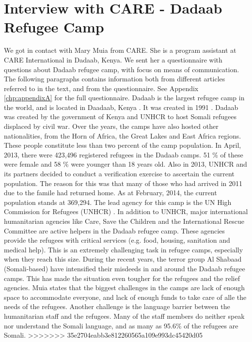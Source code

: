 \section{Interview with CARE - Dadaab Refugee Camp}
We got in contact with Mary Muia from CARE. She is a program assistant at CARE International in Dadaab, Kenya. We sent her a questionnaire with questions about Dadaab refugee camp, with focus on means of communication. The following paragraphs contains information both from different articles referred to in the text, and from the questionnaire. See Appendix \ref{chp:appendixA} for the full questionnaire. Dadaab is the largest refugee camp in the world, and is located in Daadaab, Kenya \cite{dadaab}. It was created in 1991 \cite{dadaabcare}. Dadaab was created by the government of Kenya and UNHCR to host Somali refugees displaced by civil war. Over the years, the camps have also hosted other nationalities, from the Horn of Africa, the Great Lakes and East Africa regions. These people constitute less than two percent of the camp population. In April, 2013, there were 423,496 registered refugees in the Dadaab camps. 51 \% of these were female and 58 \% were younger than 18 years old. Also in 2013, UNHCR and its partners decided to conduct a verification exercise to ascertain the current population. The reason for this was that many of those who had arrived in 2011 due to the famile had returned home. As at February, 2014, the current population stands at 369,294. The lead agency for this camp is the UN High Commission for Refugees (UNHCR) \cite{dadaab}. In addition to UNHCR, major international humanitarian agencies like Care, Save the Children and the International Rescue Committee  are active helpers in the Dadaab refugee camp. These agencies provide the refugees with critical services (e.g. food, housing, sanitation and medical help). This is an extremely challenging task in refugee camps, especially when they reach this size. During the recent years, the terror group Al Shabaad (Somali-based) have intensified their misdeeds in and around the Dadaab refugee camps. This has made the situation even tougher for the refugees and the relief agencies. 
Muia states that the biggest challenges in the camps are lack of enough space to accommodate everyone, and lack of enough funds to take care of alle the needs of the refugees. Another challenge is the language barrier between the humanitarian staff and the refugees. Many of the staff members do neither speak nor understand the Somali language, and as many as 95.6\% of the refugees are Somali. 
>>>>>>> 35e2704eabb3e812260565a109e993dc45420d05


